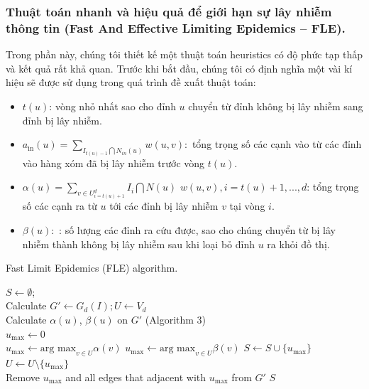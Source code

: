  	\subsubsection{Thuật toán nhanh và hiệu quả để giới hạn sự lây nhiễm thông tin (Fast And Effective Limiting Epidemics – FLE).}
 	Trong phần này, chúng tôi thiết kế một thuật toán heuristics có độ phức tạp thấp và kết quả rất khả quan. Trước khi bắt đầu, chúng tôi có định nghĩa một vài kí hiệu sẽ được sử dụng trong quá trình đề xuất thuật toán:
 	\begin {itemize}
 	\item $t(u)$: vòng nhỏ nhất sao cho đỉnh $u$ chuyển từ đỉnh không bị lây nhiễm sang đỉnh bị lây nhiễm.
 	
 	\item $a_{\text{in}}(u) = \sum_{I_{t(u) - 1} \bigcap N_{in}(u)} w(u,v):$ tổng trọng số các cạnh vào từ các đỉnh vào hàng xóm đã bị lây nhiễm trước vòng $t(u)$.
 	
 	\item $\alpha(u) = \sum_{v \in U^{d}_{i=t(u)+1}} I_{i} \bigcap N(u)$ $w(u,v), i = t(u) + 1, ... , d$: tổng trọng số các cạnh ra từ $u$ tới các đỉnh bị lây nhiễm $v$ tại vòng $i$.
 	
 	\item $\beta(u): $ : số lượng các đỉnh ra cứu được, sao cho chúng chuyển từ bị lây nhiễm thành không bị lây nhiễm sau khi loại bỏ đỉnh $u$ ra khỏi đồ thị.
 	\end {itemize}
 	 	\begin{algorithm}[hpt]
 		\caption{Fast Limit Epidemics (FLE) algorithm.}
 		\label{alg:Algo1}
 		$S \gets \emptyset$; 
 		\\
 		Calculate $G' \gets G_{d}(I); U \gets V_{d}$
 		\\
 		{
 			Calculate $\alpha(u)$, $\beta(u)$ on $G'$ (Algorithm 3)
 			\\
 			$u_{\text{max}} \gets 0$
 			\\
 			{
 				$u_{\text{max}} \gets \text{arg max}_{v \in U}\alpha(v)$
 			}
 			{
 				$u_{\text{max}} \gets \text{arg max}_{v \in U}\beta(v)$
 			}
 			$S \gets S \cup \{u_{\text{max}}\}$
 			\\
 			$U \gets U \setminus \{u_{\text{max}}\}$
 			\\
 			Remove $u_{\text{max}}$ and all edges that adjacent with $u_{\text{max}}$ from $G'$
 		}
 		\Return $S$
 	\end{algorithm}
  	
